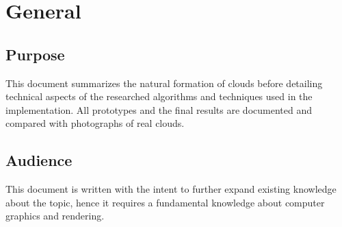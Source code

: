 \section{General}

\subsection{Purpose}
This document summarizes the natural formation of clouds before detailing technical aspects of the researched algorithms and techniques used in the implementation.
All prototypes and the final results are documented and compared with photographs of real clouds.

\subsection{Audience}
This document is written with the intent to further expand existing knowledge about the topic, hence it requires a fundamental knowledge about computer graphics and rendering.

